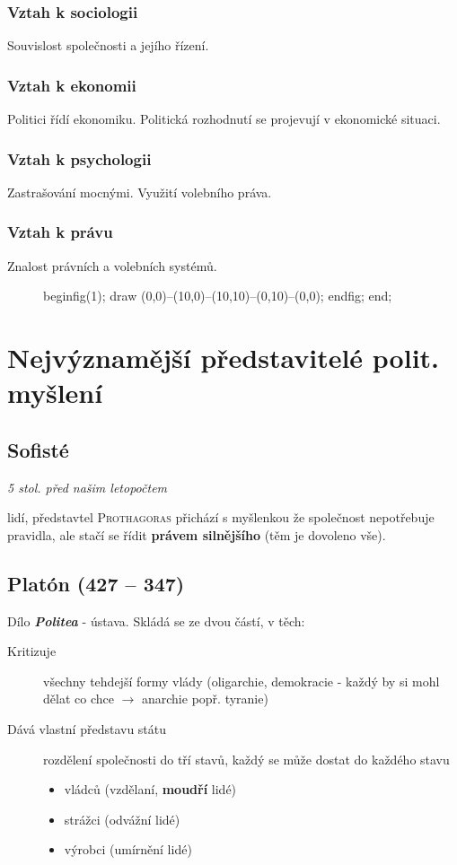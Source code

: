 \documentclass[10pt,a4paper,
twoside,%
]{report}
\begin{document}
\subsubsection{Vztah k sociologii}
Souvislost společnosti a jejího řízení.
\subsubsection{Vztah k ekonomii}
Politici řídí ekonomiku. Politická rozhodnutí se projevují v ekonomické situaci.
\subsubsection{Vztah k psychologii}
Zastrašování mocnými. Využití volebního práva.
\subsubsection{Vztah k právu}
Znalost právních a volebních systémů.

\begin{figure}
beginfig(1);
draw (0,0)--(10,0)--(10,10)--(0,10)--(0,0);
endfig;
end;
\end{figure}

\section[Představitelé]{Nejvýznamější představitelé polit. myšlení}

\subsection{Sofisté}
\emph{5 stol. před našim letopočtem}

 lidí, představtel \textsc{Prothagoras} přichází s myšlenkou že společnost nepotřebuje pravidla, ale stačí se řídit \textbf{právem silnějšího} (těm je dovoleno vše).

\subsection[Platón]{Platón (427 -- 347)}

Dílo \emph{\textbf{Politea}} - ústava. Skládá se ze dvou částí, v těch:
\begin{description}
\item [Kritizuje] všechny tehdejší formy vlády (oligarchie, demokracie - každý by si mohl dělat co chce $\rightarrow$ anarchie popř. tyranie)
\item [Dává vlastní představu státu] rozdělení společnosti do tří stavů, každý se může dostat do každého stavu\begin{itemize}
\item vládců (vzdělaní, \textbf{moudří} lidé)
\item strážci (odvážní lidé)
\item výrobci (umírnění lidé)
\end{itemize}
\end{description}
\end{document}
